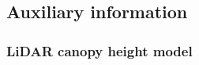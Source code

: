 

\subsection{Auxiliary information}
\label{sec:auxinfo}

\subsubsection{LiDAR canopy height model}
\label{sec:chm}

